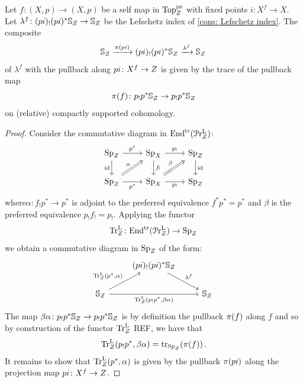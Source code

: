 \begin{prop}\label{prop: Top Lefschetz}
Let $f\colon (X,p)\to (X,p)$ be a self map in $\mathrm{Top}^{\mathrm{ps}}_{Z}$ with 
fixed points $i\colon X^f\to X$. 
Let $\lambda^f\colon (pi)_!(pi)^{\ast}\mathbb{S}_{Z} \to \mathbb{S}_{Z}$ be
the Lefschetz index of \cref{cons: Lefschetz index}. 
The composite 
\[ \mathbb{S}_{Z} \xrightarrow{\pi(pi)} (pi)_!(pi)^{\ast}\mathbb{S}_{Z}
\xrightarrow{\lambda^f} \mathbb{S}_{Z}\,\]
of $\lambda^f$ with the pullback along $pi\colon X^f\to Z$ is given by the trace of the pullback map 
\[ \pi(f)\colon p_!p^{\ast}\mathbb{S}_{Z}\to p_!p^{\ast}\mathbb{S}_{Z} \]
on (relative) compactly supported cohomology.
\end{prop}
\begin{proof}
    Consider the commutative diagram in $\mathrm{End}^{\mathrm{tr}}(\mathcal{P}\mathrm{r}^{\mathrm{L}}_{Z})$:
\begin{equation}\label{eq: categorical factorization top}
   \begin{tikzcd}
	{\D{\base}} & {\D{X}} & {\D{\base}} \\
	{\D{\base}} & {\D{X}} & {\D{\base}}
	\arrow["{p^*}", from=1-1, to=1-2]
	\arrow["\id"', from=1-1, to=2-1]
	\arrow["{p_!}", from=1-2, to=1-3]
	\arrow["{f_!}", from=1-2, to=2-2]
	\arrow["\id", from=1-3, to=2-3]
	\arrow["\alpha", Rightarrow, from=2-1, to=1-2]
	\arrow["{p^*}"', from=2-1, to=2-2]
	\arrow["\beta", Rightarrow, from=2-2, to=1-3]
	\arrow["{p_!}"', from=2-2, to=2-3]
\end{tikzcd} 
    \end{equation}
    where$\alpha\colon f_!p^*\to p^*$ is adjoint to the preferred equivalence $f^*p^* = p^*$ and $\beta$ is the preferred
    equivalence $p_!f_!=p_!$. Applying the functor 
    \[ \mathrm{Tr}^{\mathrm{L}}_{Z}\colon \mathrm{End}^{\mathrm{tr}}(\mathcal{P}\mathrm{r}^{\mathrm{L}}_{Z})\to \operatorname{Sp}_{Z}\,\]
    we obtain a commutative diagram in $\operatorname{Sp}_{Z}$ of
    the form:
    \[
\begin{tikzcd}
	{} & {(pi)_!(pi)^*\SS_{\base}} & \\
	{\SS_{\base}} && {\SS_{\base}}
	\arrow["{\lambda^f}", from=1-2, to=2-3]
	\arrow["{\TrcL(p^*,\alpha)}", from=2-1, to=1-2]
	\arrow["{\TrcL(p_!p^*, \beta\alpha)}"', from=2-1, to=2-3]
\end{tikzcd}
    \]
    The map $\beta\alpha\colon p_!p^*\mathbb{S}_{Z}\to p_!p^*\mathbb{S}_{Z}$ is by definition the pullback $\pi(f)$
    along $f$ and so by construction of the functor 
    $\mathrm{Tr}^{\mathrm{L}}_{Z}$ REF, we have that
    \[ \mathrm{Tr}^{\mathrm{L}}_{Z}(p_!p^*,\beta\alpha)= \mathrm{tr}_{\operatorname{Sp}_{Z}} (\pi(f))\,.\]
    It remains to show that $\mathrm{Tr}^{\mathrm{L}}_{Z}(p^*,\alpha)$ is given
    by the pullback $\pi(pi)$ along the projection 
    map $pi\colon X^{f}\to Z$.

\end{proof}
